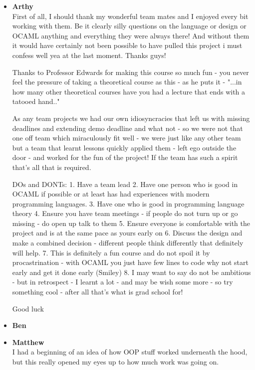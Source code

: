 
\begin{itemize}
\item {\bf Arthy}\\
First of all, I should thank my wonderful team mates and I enjoyed every bit working with them. Be it clearly silly
questions on the language or design or OCAML anything and everything they were always there! And without them it would
have certainly not been possible to have pulled this project i must confess well yea at the last moment. Thanks guys!

Thanks to Professor Edwards for making this course so much fun - you never feel the pressure of taking a theoretical course as this - as he puts it - "...in how many other theoretical courses have you had a lecture that ends with a tatooed hand.." 

As any team projects we had our own idiosyncracies that left us with missing deadlines and extending demo deadline and what not - so we were not that one off team which miraculously fit well - we were just like any other team but a team that learnt lessons quickly applied them - left ego outside the door - and worked for the fun of the project! If the team has such a spirit that's all that is required.

DOs and DONTs:
1. Have a team lead 
2. Have one person who is good in OCAML if possible or at least has had experiences with modern programming languages.
3. Have one who is good in programming language theory 
4. Ensure you have team meetings - if people do not turn up or go missing - do open up talk to them 
5. Ensure everyone is comfortable with the project and is at the same pace as yours early on
6. Discuss the design and make a combined decision - different people think differently that definitely will help.
7. This is definitely a fun course and do not spoil it by procastrination - with OCAML you just have few lines to 
code why not start early and get it done early (Smiley)
8. I may want to say do not be ambitious - but in retrospect - I learnt a lot - and may be wish some more - so 
try something cool - after all that's what is grad school for!

Good luck

\item {\bf Ben}\\

\item {\bf Matthew}\\
I had a beginning of an idea of how OOP stuff worked underneath the hood, but this really opened my eyes up to how much work was going on.


\end{itemize}
